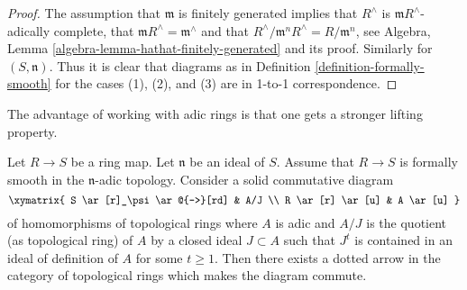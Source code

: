 \begin{proof}
The assumption that $\mathfrak m$ is finitely generated implies that
$R^\wedge$ is $\mathfrak mR^\wedge$-adically complete, that
$\mathfrak mR^\wedge = \mathfrak m^\wedge$ and that
$R^\wedge/\mathfrak m^nR^\wedge = R/\mathfrak m^n$,
see Algebra, Lemma \ref{algebra-lemma-hathat-finitely-generated}
and its proof. Similarly for $(S, \mathfrak n)$. Thus it is clear that
diagrams as in Definition \ref{definition-formally-smooth}
for the cases (1), (2), and (3) are in 1-to-1 correspondence.
\end{proof}

\noindent
The advantage of working with adic rings is that one gets a
stronger lifting property.

\begin{lemma}
\label{lemma-lift-continuous}
Let $R \to S$ be a ring map. Let $\mathfrak n$ be an ideal of $S$.
Assume that $R \to S$ is formally smooth in the $\mathfrak n$-adic
topology. Consider a solid commutative diagram
$$
\xymatrix{
S \ar[r]_\psi \ar@{-->}[rd] & A/J \\
R \ar[r] \ar[u] & A \ar[u]
}
$$
of homomorphisms of topological rings where $A$ is adic
and $A/J$ is the quotient (as topological ring) of $A$ by a closed ideal
$J \subset A$ such that $J^t$ is contained in an ideal of definition
of $A$ for some $t \geq 1$. Then there exists a dotted arrow in the category of
topological rings which makes the diagram commute.
\end{lemma}

